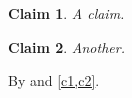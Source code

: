 \documentclass{article}
\newtheorem{claim}{Claim}
\begin{document}
\begin{claim}\label{claim:copy_K_{2,4}}\label{c1}A claim.\end{claim}
\begin{claim}\label{c2}Another.\end{claim}
By  and \cref{c1,c2}.
\end{document}
